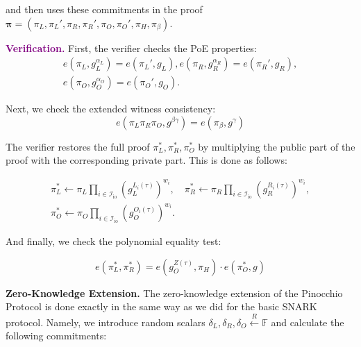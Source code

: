 \documentclass[../lecture-notes.tex]{subfiles}
\begin{document}
and then uses these commitments in the proof $\boldsymbol{\pi} = (\pi_L,\pi_L',\pi_R,\pi_R',\pi_O,\pi_O',\pi_H,\pi_{\beta})$.

\textcolor{purple}{\textbf{Verification.}} First, the verifier checks the PoE properties:
\begin{gather*}
        e(\pi_L, g_L^{\alpha_L}) = e(\pi_L', g_L), e(\pi_R, g_R^{\alpha_R}) = e(\pi_R', g_R), \\ e(\pi_O, g_O^{\alpha_O}) = e(\pi_O', g_O).
\end{gather*}

Next, we check the extended witness consistency:
\begin{equation*}
    e(\pi_L\pi_R\pi_O, g^{\beta\gamma}) = e(\pi_{\beta}, g^{\gamma})
\end{equation*}

The verifier restores the full proof $\pi_L^*,\pi_R^*,\pi_O^*$ by multiplying the public part of the proof with the corresponding private part. This is done as follows:

\vspace{-4mm}

\begin{gather*}
        \pi_L^* \gets \pi_L\prod_{i \in \mathcal{I}_{\text{io}}} (g_L^{L_i(\tau)})^{w_i}, \quad 
        \pi_R^* \gets \pi_R\prod_{i \in \mathcal{I}_{\text{io}}} (g_R^{R_i(\tau)})^{w_i}, \\
        \pi_O^* \gets \pi_O\prod_{i \in \mathcal{I}_{\text{io}}} (g_O^{O_i(\tau)})^{w_i}.        
\end{gather*}

\vspace{-2mm}

And finally, we check the polynomial equality test:

\vspace{-2mm}

\begin{equation*}
    e(\pi_L^*, \pi_R^*) = e(g_O^{Z(\tau)}, \pi_H)\cdot e(\pi_O^*, g)
\end{equation*}

\vspace{-1mm}

\textcolor{blue!75!gray}{\textbf{Zero-Knowledge Extension.}} The zero-knowledge extension of the Pinocchio Protocol is done exactly in the same way as we did for the basic SNARK protocol. Namely, we introduce random scalars $\delta_L, \delta_R, \delta_O \xleftarrow{R} \mathbb{F}$ and calculate the following commitments:
\end{document}
